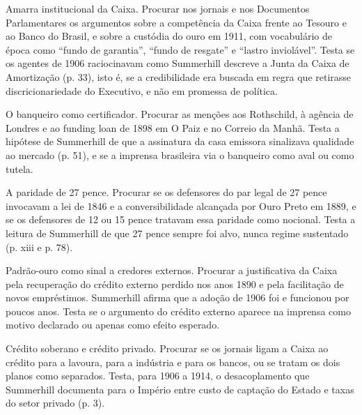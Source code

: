 \begin{dialogo}
\item Amarra institucional da Caixa. Procurar nos jornais e nos Documentos Parlamentares os argumentos sobre a competência da Caixa frente ao Tesouro e ao Banco do Brasil, e sobre a custódia do ouro em 1911, com vocabulário de época como ``fundo de garantia'', ``fundo de resgate'' e ``lastro inviolável''. Testa se os agentes de 1906 raciocinavam como Summerhill descreve a Junta da Caixa de Amortização (p. 33), isto é, se a credibilidade era buscada em regra que retirasse discricionariedade do Executivo, e não em promessa de política.
\item O banqueiro como certificador. Procurar as menções aos Rothschild, à agência de Londres e ao funding loan de 1898 em O Paiz e no Correio da Manhã. Testa a hipótese de Summerhill de que a assinatura da casa emissora sinalizava qualidade ao mercado (p. 51), e se a imprensa brasileira via o banqueiro como aval ou como tutela.
\item A paridade de 27 pence. Procurar se os defensores do par legal de 27 pence invocavam a lei de 1846 e a conversibilidade alcançada por Ouro Preto em 1889, e se os defensores de 12 ou 15 pence tratavam essa paridade como nocional. Testa a leitura de Summerhill de que 27 pence sempre foi alvo, nunca regime sustentado (p. xiii e p. 78).
\item Padrão-ouro como sinal a credores externos. Procurar a justificativa da Caixa pela recuperação do crédito externo perdido nos anos 1890 e pela facilitação de novos empréstimos. Summerhill afirma que a adoção de 1906 foi  e funcionou por poucos anos. Testa se o argumento do crédito externo aparece na imprensa como motivo declarado ou apenas como efeito esperado.
\item Crédito soberano e crédito privado. Procurar se os jornais ligam a Caixa ao crédito para a lavoura, para a indústria e para os bancos, ou se tratam os dois planos como separados. Testa, para 1906 a 1914, o desacoplamento que Summerhill documenta para o Império entre custo de captação do Estado e taxas do setor privado (p. 3).
\end{dialogo}

